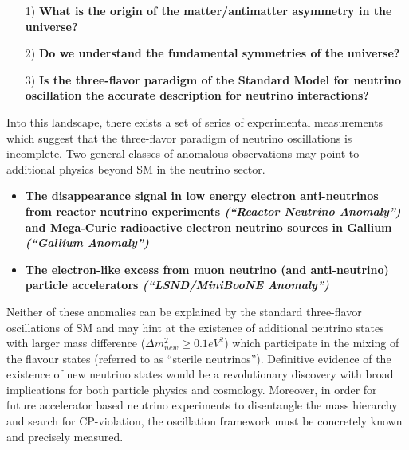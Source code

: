 \begin{itemize}[noitemsep,nolistsep]
\item[1)] \textbf{What is the origin of the matter/antimatter asymmetry in the universe?}

\item[2)] \textbf{Do we understand the fundamental symmetries of the universe?}

\item[3)] \textbf{Is the three-flavor paradigm of the Standard Model for neutrino oscillation the accurate description for neutrino interactions?}
\end{itemize}

\noindent Into this landscape, there exists a set of series of experimental measurements which suggest that the three-flavor paradigm of neutrino oscillations is incomplete. Two general classes of anomalous observations may point to additional physics beyond SM  in the neutrino sector.

\begin{itemize}[noitemsep,nolistsep]
\item \textbf{The disappearance signal in low energy electron anti-neutrinos from reactor neutrino experiments \cite{if:reactor} \textit{(``Reactor Neutrino Anomaly'')} and Mega-Curie radioactive electron neutrino sources in Gallium \cite{if:gallex, if:sage} \textit{(``Gallium Anomaly'')}}

\item \textbf{The electron-like excess from muon neutrino (and anti-neutrino) particle accelerators \textit{(``LSND/MiniBooNE Anomaly'')} \cite{No16, No17}}

\end{itemize}

Neither of these anomalies can be explained by the standard three-flavor oscillations of SM and may hint at the existence of additional neutrino states with larger mass difference ($\Delta m_{new}^{2}\geq 0.1 eV^{2}$) which participate in the mixing of the flavour states (referred to as ``sterile neutrinos''). Definitive evidence of the existence of new neutrino states would be a revolutionary discovery with broad implications for both particle physics and cosmology. Moreover, in order for future accelerator based neutrino experiments to disentangle the mass hierarchy and search for CP-violation, the oscillation framework must be concretely known and precisely measured.

